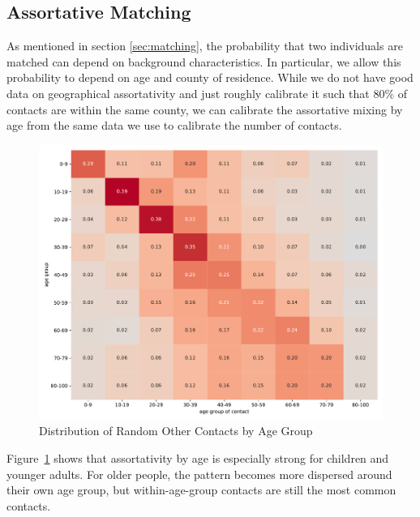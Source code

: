 \FloatBarrier


\subsection{Assortative Matching}

As mentioned in section \ref{sec:matching}, the probability that two individuals are
matched can depend on background characteristics. In particular, we allow this
probability to depend on age and county of residence. While we do not have good data on
geographical assortativity and just roughly calibrate it such that 80\% of contacts are
within the same county, we can calibrate the assortative mixing by age from the same
data we use to calibrate the number of contacts.

\begin{figure}[ht]
    \centering
    \includegraphics[width=0.9 \textwidth]{../figures/results/figures/data/assortativity_other_non_recurrent}
    \caption{Distribution of Random Other Contacts by Age Group}
    \label{fig:assortativity}
\end{figure}

Figure~\ref{fig:assortativity} shows that
assortativity by age is especially strong for children and younger adults. For older
people, the pattern becomes more dispersed around their own age group, but
within-age-group contacts are still the most common contacts.

